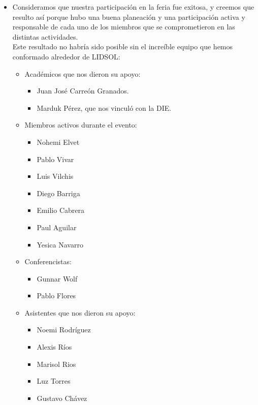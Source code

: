 \documentclass[a4paper,11pt]{article}                 %
\begin{document}
    \begin{itemize}
    
    \item Consideramos que nuestra participación en la feria fue exitosa, y creemos que resulto así porque hubo una buena planeación y una participación activa y responsable de cada uno de los miembros que se comprometieron en las distintas actividades. \\Este resultado no habría sido posible sin el increíble equipo que hemos conformado alrededor de LIDSOL:
    \begin{itemize}
      \item Académicos que nos dieron su apoyo:
      \begin{itemize}
        \item Juan José Carreón Granados.
        \item Marduk Pérez, que nos vinculó con la DIE.
      \end{itemize}
      \item Miembros activos durante el evento:
          \begin{itemize}
      \item Nohemi Elvet
      \item Pablo Vivar
      \item Luis Vilchis
      \item Diego Barriga
      \item Emilio Cabrera
      \item Paul Aguilar
      \item Yesica Navarro
    \end{itemize}
    \item Conferencistas:
    \begin{itemize}
      \item Gunnar Wolf
      \item Pablo Flores
    \end{itemize}
      \item Asistentes que nos dieron su apoyo:
      \begin{itemize}
        \item Noemi Rodríguez
        \item Alexis Ríos
        \item Marisol Rios
        \item Luz Torres
        \item Gustavo Chávez 
      \end{itemize}
    \end{itemize}



\end{itemize}
\end{document}
